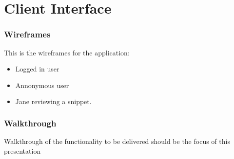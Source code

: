 \documentclass[handout, t]{beamer}
\begin{document}
\section{Client Interface}

\begin{frame}
\frametitle{Wireframes}
This is the wireframes for the application:
\begin{itemize}
\item Logged in user
\item Annonymous user
\item Jane reviewing a snippet.
\end{itemize}
\end{frame}

\begin{frame}
\frametitle{Walkthrough}
Walkthrough of the functionality to be delivered should be the focus of
this presentation
\end{frame}
\end{document}
